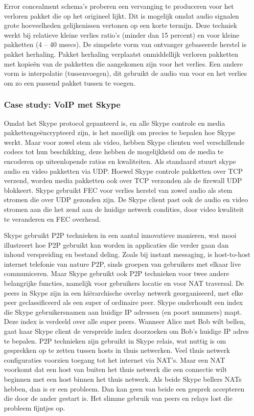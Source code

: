 \noindent Error concealment schema’s proberen een vervanging te produceren voor het verloren pakket die op het origineel lijkt. Dit is mogelijk omdat audio signalen grote hoeveelheden gelijkenissen vertonen op een korte termijn. Deze techniek werkt bij relatieve kleine verlies ratio’s (minder dan 15 percent) en voor kleine pakketten (4 – 40 msecs). De simpelste vorm van ontvanger gebaseerde herstel is pakket herhaling. Pakket herhaling verplaatst onmiddellijk verloren pakketten met kopieën van de pakketten die aangekomen zijn voor het verlies. Een andere vorm is interpolatie (tussenvoegen), dit gebruikt de audio van voor en het verlies om zo een passend pakket tussen te voegen.

\newpage

\subsubsection{Case study: VoIP met Skype}

\noindent Omdat het Skype protocol gepanteerd is, en alle Skype controle en media pakkettengeëncrypteerd zijn, is het moeilijk om precies te bepalen hoe Skype werkt. Maar voor zowel stem als video, hebben Skype clienten veel verschillende codecs tot hun beschikking, deze hebben de mogelijkheid om de media te encoderen op uiteenlopende ratios en kwaliteiten. Als standaard stuurt skype audio en video pakketten via UDP. Hoewel Skype controle pakketten over TCP verzend, worden media pakketten ook over TCP verzonden als de firewall UDP blokkeert. Skype gebruikt FEC voor verlies herstel van zowel audio als stem stromen die over UDP gezonden zijn. De Skype client past ook de audio en video stromen aan die het zend aan de huidige netwerk condities, door video kwaliteit te veranderen en FEC overhead.

\noindent Skype gebruikt P2P technieken in een aantal innovatieve manieren, wat mooi illustreert hoe P2P gebruikt kan worden in applicaties die verder gaan dan inhoud verspreiding en bestand deling. Zoals bij instant messaging, is host-to-host internet telefonie van nature P2P, sinds groepen van gebruikers met elkaar live communiceren. Maar Skype gebruikt ook P2P technieken voor twee andere belangrijke functies, namelijk voor gebruikers locatie en voor NAT traversal.
De peers in Skype zijn in een hiërarchische overlay netwerk georganiseerd, met elke peer geclassificeerd als een super of ordinaire peer. Skype onderhoudt een index die Skype gebruikersnamen aan huidige IP adressen (en poort nummers) mapt. Deze index is verdeeld over alle super peers. Wanneer Alice met Bob wilt bellen, gaat haar Skype client de verspreide index doorzoeken om Bob’s huidige IP adres te bepalen. P2P technieken zijn gebruikt in Skype relais, wat nuttig is om gesprekken op te zetten tussen hosts in thuis netwerken. Veel thuis netwerk configuraties voorzien toegang tot het internet via NAT’s. Maar een NAT voorkomt dat een host van buiten het thuis netwerk die een connectie wilt beginnen met een host binnen het thuis netwerk. Als beide Skype bellers NATs hebben, dan is er een probleem. Dan kan geen van beide een gesprek accepteren die door de ander gestart is. Het slimme gebruik van peers en relays lost die probleem fijntjes op.

